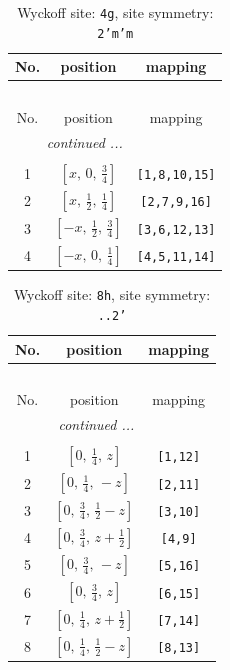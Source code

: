 \documentclass[fleqn,8pt]{jsarticle}
\begin{document}
\renewcommand{\arraystretch}{1.2}
\begin{longtable}{ccc}
\caption{Wyckoff site: {\tt 4g}, site symmetry: {\tt 2'm'm}}
 \\
 \hline \hline
No. & position & mapping \\ \hline \endfirsthead

\multicolumn{2}{l}{\tablename\ \thetable{}} \\
 \hline \hline
No. & position & mapping \\ \hline \endhead

 \hline \hline
\multicolumn{2}{r}{\footnotesize\it continued ...} \\ \endfoot

 \hline \hline
\multicolumn{2}{r}{} \\ \endlastfoot

1 & $\left[ x,\, 0,\, \frac{3}{4} \right]$ & {\tt [1,8,10,15]} \\ \hline
2 & $\left[ x,\, \frac{1}{2},\, \frac{1}{4} \right]$ & {\tt [2,7,9,16]} \\ \hline
3 & $\left[ - x,\, \frac{1}{2},\, \frac{3}{4} \right]$ & {\tt [3,6,12,13]} \\ \hline
4 & $\left[ - x,\, 0,\, \frac{1}{4} \right]$ & {\tt [4,5,11,14]} \\
\end{longtable}
\renewcommand{\arraystretch}{1.2}
\begin{longtable}{ccc}
\caption{Wyckoff site: {\tt 8h}, site symmetry: {\tt ..2'}}
 \\
 \hline \hline
No. & position & mapping \\ \hline \endfirsthead

\multicolumn{2}{l}{\tablename\ \thetable{}} \\
 \hline \hline
No. & position & mapping \\ \hline \endhead

 \hline \hline
\multicolumn{2}{r}{\footnotesize\it continued ...} \\ \endfoot

 \hline \hline
\multicolumn{2}{r}{} \\ \endlastfoot

1 & $\left[ 0,\, \frac{1}{4},\, z \right]$ & {\tt [1,12]} \\ \hline
2 & $\left[ 0,\, \frac{1}{4},\, - z \right]$ & {\tt [2,11]} \\ \hline
3 & $\left[ 0,\, \frac{3}{4},\, \frac{1}{2} - z \right]$ & {\tt [3,10]} \\ \hline
4 & $\left[ 0,\, \frac{3}{4},\, z + \frac{1}{2} \right]$ & {\tt [4,9]} \\ \hline
5 & $\left[ 0,\, \frac{3}{4},\, - z \right]$ & {\tt [5,16]} \\ \hline
6 & $\left[ 0,\, \frac{3}{4},\, z \right]$ & {\tt [6,15]} \\ \hline
7 & $\left[ 0,\, \frac{1}{4},\, z + \frac{1}{2} \right]$ & {\tt [7,14]} \\ \hline
8 & $\left[ 0,\, \frac{1}{4},\, \frac{1}{2} - z \right]$ & {\tt [8,13]} \\
\end{longtable}
\end{document}
